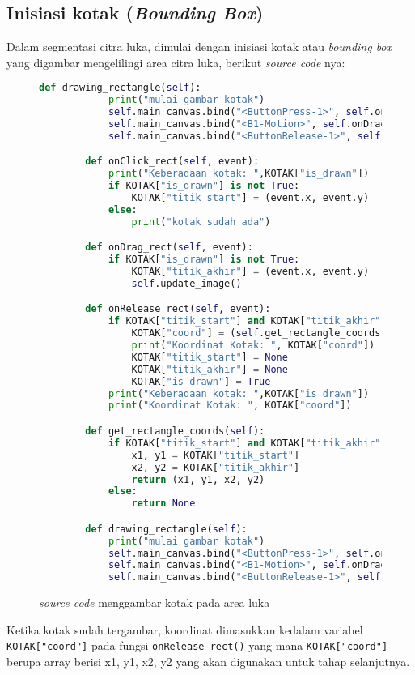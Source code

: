 \subsection{Inisiasi kotak (\emph{Bounding Box})}

Dalam segmentasi citra luka, dimulai dengan inisiasi kotak atau \emph{bounding box} 
yang digambar mengelilingi area citra luka, berikut \emph{source code} nya:

\begin{figure}[H]
	\begin{lstlisting}[language=Python, basicstyle=\tiny]
		def drawing_rectangle(self):
			print("mulai gambar kotak")
			self.main_canvas.bind("<ButtonPress-1>", self.onClick_rect)
			self.main_canvas.bind("<B1-Motion>", self.onDrag_rect)
			self.main_canvas.bind("<ButtonRelease-1>", self.onRelease_rect)

		def onClick_rect(self, event):
			print("Keberadaan kotak: ",KOTAK["is_drawn"])
			if KOTAK["is_drawn"] is not True:
				KOTAK["titik_start"] = (event.x, event.y)
			else:
				print("kotak sudah ada")

		def onDrag_rect(self, event):
			if KOTAK["is_drawn"] is not True:
				KOTAK["titik_akhir"] = (event.x, event.y)
				self.update_image()

		def onRelease_rect(self, event):
			if KOTAK["titik_start"] and KOTAK["titik_akhir"]:
				KOTAK["coord"] = (self.get_rectangle_coords())
				print("Koordinat Kotak: ", KOTAK["coord"])
				KOTAK["titik_start"] = None
				KOTAK["titik_akhir"] = None
				KOTAK["is_drawn"] = True
			print("Keberadaan kotak: ",KOTAK["is_drawn"])
			print("Koordinat Kotak: ", KOTAK["coord"])

		def get_rectangle_coords(self):
			if KOTAK["titik_start"] and KOTAK["titik_akhir"]:
				x1, y1 = KOTAK["titik_start"]
				x2, y2 = KOTAK["titik_akhir"]
				return (x1, y1, x2, y2)
			else:
				return None

		def drawing_rectangle(self):
			print("mulai gambar kotak")
			self.main_canvas.bind("<ButtonPress-1>", self.onClick_rect)
			self.main_canvas.bind("<B1-Motion>", self.onDrag_rect)
			self.main_canvas.bind("<ButtonRelease-1>", self.onRelease_rect)

	\end{lstlisting}
	\caption{\emph{source code} menggambar kotak pada area luka}
	\label{img:inisiasi_rectangle}
\end{figure}

Ketika kotak sudah tergambar, koordinat dimasukkan kedalam variabel \texttt{KOTAK["coord"]}
pada fungsi \texttt{onRelease\_rect()} yang mana \texttt{KOTAK["coord"]} berupa array 
berisi x1, y1, x2, y2 yang akan digunakan untuk tahap selanjutnya.

